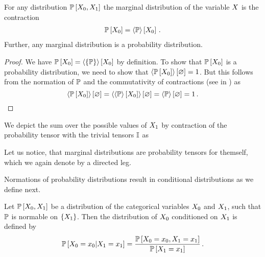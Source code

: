 \begin{theorem}\label{the:marginalContraction}
	For any distribution $\mathbb{P}\left[X_{0},X_{1}\right]$ the marginal distribution of the variable $X$ is the contraction
	\begin{align*}
		\mathbb{P}\left[X_{0}\right] = \left\langle \mathbb{P}\right\rangle \left[ X_{0} \right] \, .
	\end{align*}
	Further, any marginal distribution is a probability distribution.
\end{theorem}
\begin{proof}
	We have $\mathbb{P}\left[X_{0}\right] = \left\langle \{\mathbb{P}\}\right\rangle \left[ X_{0} \right]$ by definition.
	To show that $\mathbb{P}\left[X_{0}\right]$ is a probability distribution, we need to show that $\left\langle \mathbb{P}\left[X_{0}\right]\right\rangle \left[ \varnothing \right]=1$.
	But this follows from the normation of $\mathbb{P}$ and the commutativity of contractions (see  in ) as
		\[ \left\langle \mathbb{P}\left[X_{0}\right]\right\rangle \left[ \varnothing \right] = 
		\left\langle 
			\left\langle \mathbb{P}\right\rangle \left[ X_{0} \right]
		\right\rangle \left[ \varnothing \right] =
		 \left\langle \mathbb{P}\right\rangle \left[ \varnothing \right]
		= 1 \, . 
		\]
\end{proof}

We depict the sum over the possible values of $X_{1}$ by contraction of the probability tensor with the trivial tensors $\mathbb{I}$ as 
\begin{center}
	
\end{center}
Let us notice, that marginal distributions are probability tensors for themself, which we again denote by a directed leg.



Normations of probability distributions result in conditional distributions as we define next.

\begin{definition}\label{def:conditionalProbability}
	Let $\mathbb{P}\left[X_{0},X_{1}\right]$ be a distribution of the categorical variables $X_{0}$ and $X_{1}$, such that $\mathbb{P}$ is normable on $\{X_{1}\}$.
	Then the distribution of $X_{0}$ conditioned on $X_{1}$ is defined by
		\[ \mathbb{P}\left[X_{0}=x_{0}|X_{1}=x_{1}\right]  
		= \frac{\mathbb{P}\left[X_{0}=x_{0},X_{1}=x_{1}\right]}{\mathbb{P}\left[X_{1}=x_{1}\right]} \, . \]
\end{definition}


